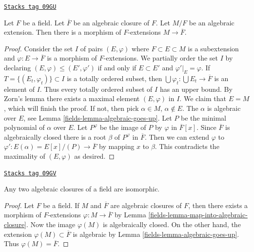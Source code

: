 \begin{lemma}
\label{fields-lemma-map-into-algebraic-closure}
\href{https://stacks.math.columbia.edu/tag/09GU}{\texttt{Stacks tag 09GU}}

Let $F$ be a field. Let $\overline{F}$ be an algebraic closure of $F$.
Let $M/F$ be an algebraic extension. Then there is a morphism of
$F$-extensions $M \to \overline{F}$.
\end{lemma}

\begin{proof}

Consider the set $I$ of pairs $(E, \varphi)$ where $F \subset E \subset M$
is a subextension and $\varphi : E \to \overline{F}$ is a morphism of
$F$-extensions. We partially order the set $I$ by declaring
$(E, \varphi) \leq (E', \varphi')$ if and only if $E \subset E'$ and
$\varphi'|_E = \varphi$. If $T = \{(E_t,  \varphi_t)\} \subset I$
is a totally ordered subset, then
$\bigcup \varphi_t : \bigcup E_t \to \overline{F}$ is an element of $I$.
Thus every totally ordered subset of $I$ has an upper bound.
By Zorn's lemma there exists a maximal element $(E, \varphi)$ in $I$.
We claim that $E = M$, which will finish the proof. If not, then
pick $\alpha \in M$, $\alpha \not \in E$. The $\alpha$ is algebraic
over $E$, see Lemma \ref{fields-lemma-algebraic-goes-up}.
Let $P$ be the minimal polynomial of $\alpha$ over $E$.
Let $P^\varphi$ be the image of $P$ by $\varphi$ in $\overline{F}[x]$.
Since $\overline{F}$ is algebraically closed there is a root $\beta$
of $P^\varphi$ in $\overline{F}$. Then we can extend $\varphi$ to
$\varphi' : E(\alpha) = E[x]/(P) \to \overline{F}$ by mapping
$x$ to $\beta$. This contradicts the maximality of $(E, \varphi)$
as desired.
\end{proof}

\begin{lemma}
\label{fields-lemma-algebraic-closures-isomorphic}
\href{https://stacks.math.columbia.edu/tag/09GV}{\texttt{Stacks tag 09GV}}

Any two algebraic closures of a field are isomorphic.
\end{lemma}

\begin{proof}

Let $F$ be a field. If $M$ and $\overline{F}$ are algebraic closures of
$F$, then there exists a morphism of $F$-extensions
$\varphi : M \to \overline{F}$ by
Lemma \ref{fields-lemma-map-into-algebraic-closure}.
Now the image $\varphi(M)$ is algebraically closed.
On the other hand, the extension $\varphi(M) \subset \overline{F}$
is algebraic by Lemma \ref{fields-lemma-algebraic-goes-up}.
Thus $\varphi(M) = \overline{F}$.
\end{proof}

